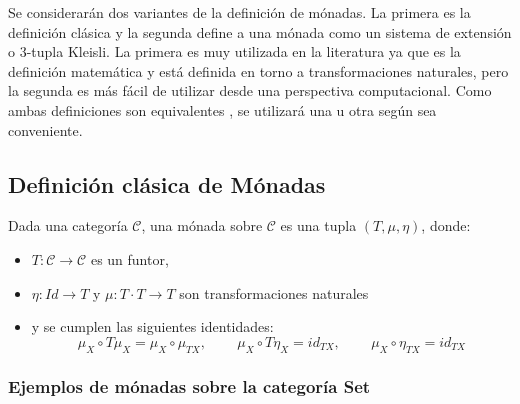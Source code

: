 Se considerarán dos variantes de la definición de mónadas. La primera es la definición clásica y la segunda define a una mónada como un sistema de extensión o 3-tupla Kleisli. La primera es muy utilizada en la literatura ya que es la definición matemática y está definida en torno a transformaciones naturales, pero la segunda es más fácil de utilizar desde una perspectiva computacional. Como ambas definiciones son equivalentes \cite{moggi:1991}, se utilizará una u otra según sea conveniente.

\subsection{Definición clásica de Mónadas}\label{monadas:usual}

Dada una categoría $\mathscr{C}$, una mónada sobre $\mathscr{C}$ es una tupla $(\mathit{T},\mu,\eta)$, donde:
\vspace{-0.75\baselineskip}
\begin{itemize}[noitemsep,label=$\blacktriangleright$]
	\item $\mathit{T} : \mathscr{C} \rightarrow \mathscr{C}$ es un funtor,
	\item $\eta : \mathit{Id} \rightarrow \mathit{T}$ y $\mu : \mathit{T} \cdot \mathit{T} \rightarrow \mathit{T}$ son transformaciones naturales
	\item y se cumplen las siguientes identidades:
	\begin{equation*}
		\mu_X \circ \mathit{T}\mu_X = \mu_X \circ \mu_{\mathit{T}X} \text{, } \qquad \mu_X \circ \mathit{T}\eta_X = id_{\mathit{T}X} \text{, } \qquad 
		\mu_X \circ \eta_{\mathit{T}X} = id_{\mathit{T}X} 
	\end{equation*}
\end{itemize}

\subsubsection{Ejemplos de mónadas sobre la categoría Set}
\vspace{-0.75\baselineskip}
